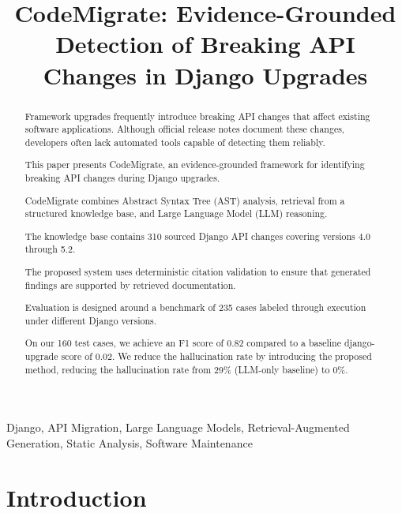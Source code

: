 \documentclass[conference]{IEEEtran}
\begin{document}
\title{CodeMigrate: Evidence-Grounded Detection of Breaking API Changes in Django Upgrades}

\author{
}

\maketitle

\begin{abstract}

Framework upgrades frequently introduce breaking API changes
that affect existing software applications. Although official
release notes document these changes, developers often lack
automated tools capable of detecting them reliably.

This paper presents CodeMigrate, an evidence-grounded
framework for identifying breaking API changes during
Django upgrades.

CodeMigrate combines Abstract Syntax Tree (AST) analysis,
retrieval from a structured knowledge base, and
Large Language Model (LLM) reasoning.

The knowledge base contains 310 sourced Django API changes
covering versions 4.0 through 5.2.

The proposed system uses deterministic citation validation
to ensure that generated findings are supported by
retrieved documentation.

Evaluation is designed around a benchmark of 235 cases
labeled through execution under different Django versions.

On our 160 test cases, we achieve an F1 score of 0.82 compared to a baseline django-upgrade score
of 0.02. We reduce the hallucination rate by introducing the proposed method, reducing the
hallucination rate from 29\% (LLM-only baseline) to 0\%.

\end{abstract}

\begin{IEEEkeywords}
Django, API Migration, Large Language Models,
Retrieval-Augmented Generation, Static Analysis,
Software Maintenance
\end{IEEEkeywords}

\section{Introduction}
\end{document}
